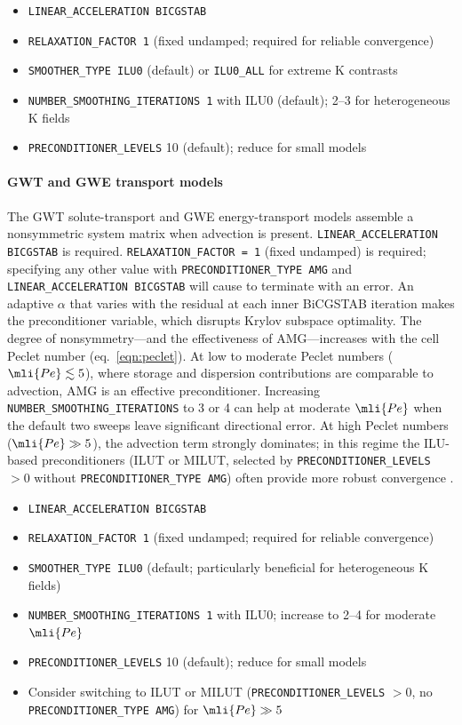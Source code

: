 \begin{itemize}
  \item \texttt{LINEAR\_ACCELERATION BICGSTAB}
  \item \texttt{RELAXATION\_FACTOR 1} (fixed undamped; required for reliable convergence)
  \item \texttt{SMOOTHER\_TYPE ILU0} (default) or \texttt{ILU0\_ALL} for extreme K contrasts
  \item \texttt{NUMBER\_SMOOTHING\_ITERATIONS 1} with ILU0 (default); 2--3 for heterogeneous K fields
  \item \texttt{PRECONDITIONER\_LEVELS} 10 (default); reduce for small models
\end{itemize}

\paragraph{GWT and GWE transport models}
The GWT solute-transport and GWE energy-transport models assemble a nonsymmetric system matrix when advection is present. \texttt{LINEAR\_ACCELERATION BICGSTAB} is required. \texttt{RELAXATION\_FACTOR = 1} (fixed undamped) is required; specifying any other value with \texttt{PRECONDITIONER\_TYPE AMG} and \texttt{LINEAR\_ACCELERATION BICGSTAB} will cause \mf to terminate with an error. An adaptive $\alpha$ that varies with the residual at each inner BiCGSTAB iteration makes the preconditioner variable, which disrupts Krylov subspace optimality. The degree of nonsymmetry---and the effectiveness of AMG---increases with the cell Peclet number (eq.~\ref{eqn:peclet}). At low to moderate Peclet numbers ($\mli{Pe} \lesssim 5$), where storage and dispersion contributions are comparable to advection, AMG is an effective preconditioner. Increasing \texttt{NUMBER\_SMOOTHING\_ITERATIONS} to 3 or 4 can help at moderate $\mli{Pe}$ when the default two sweeps leave significant directional error. At high Peclet numbers ($\mli{Pe} \gg 5$), the advection term strongly dominates; in this regime the ILU-based preconditioners (ILUT or MILUT, selected by \texttt{PRECONDITIONER\_LEVELS} $> 0$ without \texttt{PRECONDITIONER\_TYPE AMG}) often provide more robust convergence \citep{elman2014}.

\begin{itemize}
  \item \texttt{LINEAR\_ACCELERATION BICGSTAB}
  \item \texttt{RELAXATION\_FACTOR 1} (fixed undamped; required for reliable convergence)
  \item \texttt{SMOOTHER\_TYPE ILU0} (default; particularly beneficial for heterogeneous K fields)
  \item \texttt{NUMBER\_SMOOTHING\_ITERATIONS 1} with ILU0; increase to 2--4 for moderate $\mli{Pe}$
  \item \texttt{PRECONDITIONER\_LEVELS} 10 (default); reduce for small models
  \item Consider switching to ILUT or MILUT (\texttt{PRECONDITIONER\_LEVELS} $> 0$, no \texttt{PRECONDITIONER\_TYPE AMG}) for $\mli{Pe} \gg 5$
\end{itemize}

